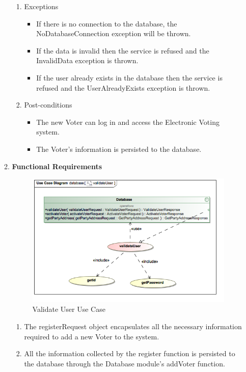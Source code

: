 \begin{enumerate}
\begin{enumerate}
\begin{enumerate}
					\item Exceptions
					\begin{itemize}
						\item If there is no connection to the database, the NoDatabaseConnection exception will be thrown.
						\item If the data is invalid then the service is refused and the InvalidData exception is thrown.
						\item If the user already exists in the database then the service is refused and the UserAlreadyExists exception is thrown.
					\end{itemize}
					
					\item Post-conditions
					\begin{itemize}
						\item The new Voter can log in and access the Electronic Voting system. 
						\item The Voter’s information is persisted to the database.
					\end{itemize}
				\end{enumerate}
			
			\item \textbf{Functional Requirements}
				\begin{figure}[H]
					\centering
					\includegraphics[width=0.75\linewidth]{../Images/Database/UseCases/ValidateUser_UseCase.png}
					\caption{Validate User Use Case}
				\end{figure}
				
				\begin{enumerate}
					\item The registerRequest object encapsulates all the necessary information required to add a new Voter to the system. 
					\item All the information collected by the register function is persisted to the database through the Database module's addVoter function. 
				\end{enumerate}
				

\end{enumerate}
\end{enumerate}
